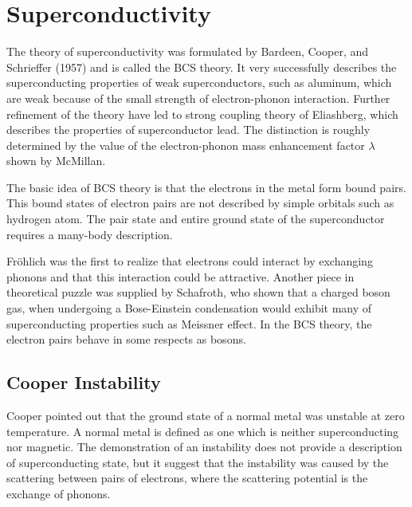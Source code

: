 \chapter{Superconductivity}
The theory of superconductivity was formulated by Bardeen, Cooper, and Schrieffer (1957) and is called the BCS theory.
It very successfully describes the superconducting properties of weak superconductors, such as aluminum, which are weak because of the small strength of electron-phonon interaction.
Further refinement of the theory have led to strong coupling theory of Eliashberg, which describes the properties of superconductor lead.
The distinction is roughly determined by the value of the electron-phonon mass enhancement factor $\lambda$ shown by McMillan.

The basic idea of BCS theory is that the electrons in the metal form bound pairs.
This bound states of electron pairs are not described by simple orbitals such as hydrogen atom.
The pair state and entire ground state of the superconductor requires a many-body description.

Fr{\"o}hlich was the first to realize that electrons could interact by exchanging phonons and that this interaction could be attractive.
Another piece in theoretical puzzle was supplied by Schafroth, who shown that a charged boson gas, when undergoing a Bose-Einstein condensation would exhibit many of superconducting properties such as Meissner effect.
In the BCS theory, the electron pairs behave in some respects as bosons.

\section{Cooper Instability} \label{s10.1}
Cooper pointed out that the ground state of a normal metal was unstable at zero temperature.
A normal metal is defined as one which is neither superconducting nor magnetic.
The demonstration of an instability does not provide a description of superconducting state, but it suggest that the instability was caused by the scattering between pairs of electrons, where the scattering potential is the exchange of phonons.

